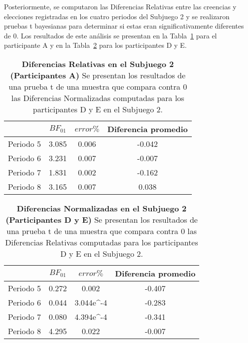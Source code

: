 Posteriormente, se computaron las Diferencias Relativas entre las creencias y elecciones registradas en los cuatro periodos del Subjuego 2 y se realizaron pruebas t bayesianas para determinar si estas eran significativamente diferentes de 0. Los resultados de este análisis se presentan en la Tabla~\ref{DR-S2-A-B} para el participante A y en la Tabla~\ref{DR-S2-DyE-B} para los participantes D y E.\\

\begin{table}[h]
\caption[Diferencias Relativas en el Subjuego 2; Participantes A (Pruebas t de una muestra)]{\textbf{Diferencias Relativas en el Subjuego 2 (Participantes A)} Se presentan los resultados de una prueba t de una muestra que compara contra 0 las Diferencias Normalizadas computadas para los participantes D y E en el Subjuego 2.}
\label{DR-S2-A-B}
\centering
\begin{tabular}{l | c c | c}
\toprule
\textbf{} & \textbf{$BF_{01}$} & \textbf{$error\%$} & \textbf{Diferencia promedio}\\
\midrule
Periodo 5 & 3.085 & 0.006 & -0.042\\
Periodo 6 & 3.231 & 0.007 & -0.007\\
Periodo 7 & 1.831 & 0.002 & -0.162\\
Periodo 8 & 3.165 & 0.007 & 0.038\\
\bottomrule
\end{tabular}
\end{table}

\begin{table}[h]
\caption[Diferencias Relativas en el Subjuego 2; Participantes D y E (Pruebas t de una muestra)]{\textbf{Diferencias Normalizadas en el Subjuego 2 (Participantes D y E)} Se presentan los resultados de una prueba t de una muestra que compara contra 0 las Diferencias Relativas computadas para los participantes D y E en el Subjuego 2.}
\label{DR-S2-DyE-B}
\centering
\begin{tabular}{l | c c | c}
\toprule
\textbf{} & \textbf{$BF_{01}$} & \textbf{$error\%$} & \textbf{Diferencia promedio}\\
\midrule
Periodo 5 & 0.272 & 0.002 & -0.407\\
Periodo 6 & 0.044 & 3.044e^-4 & -0.283\\
Periodo 7 & 0.080 & 4.394e^-4 & -0.341\\
Periodo 8 & 4.295 & 0.022 & -0.007\\
\bottomrule
\end{tabular}
\end{table}
  
